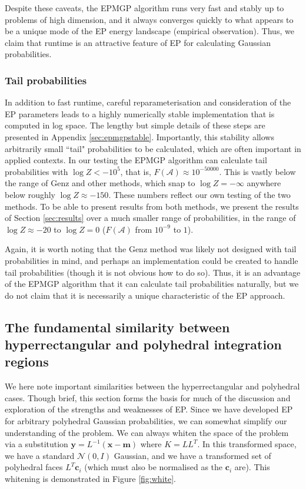\documentclass[twoside,11pt]{article}
\def\x{{\mathbf x}}
\def\y{{\mathbf y}}
\def\c{{\mathbf c}}
\def\m{{\mathbf m}}
\def\regionA{\mathcal{A}}
\begin{document}
Despite these caveats, the EPMGP algorithm runs very fast and stably up to problems of high dimension, and it always converges quickly to what appears to be a unique mode of the EP energy landscape (empirical observation).  Thus, we claim that runtime is an attractive feature of EP for calculating Gaussian probabilities.

\subsubsection{Tail probabilities}

In addition to fast runtime, careful reparameterisation and consideration of the EP parameters leads to a highly numerically stable implementation that is computed in log space.  The lengthy but simple details of these steps are presented in Appendix \ref{sec:epmgpstable}.  Importantly, this stability allows arbitrarily small ``tail" probabilities to be calculated, which are often important in applied contexts.  In our testing the EPMGP algorithm can calculate tail probabilities with $\log Z < -10^5$, that is, $F(\regionA) \approx 10^{-50000}$.  This is vastly below the range of Genz and other methods, which snap to $\log Z = -\infty$ anywhere below roughly $\log Z \approx -150$.  These numbers reflect our own testing of the two methods.  To be able to present results from both methods, we present the results of Section \ref{sec:results} over a much smaller range of probabilities, in the range of $\log Z \approx -20$ to $\log Z = 0$ ($F(\regionA)$ from $10^{-9}$ to $1$).

Again, it is worth noting that the Genz method was likely not designed with tail probabilities in mind, and perhaps an implementation could be created to handle tail probabilities (though it is not obvious how to do so).  Thus, it is an advantage of the EPMGP algorithm that it can calculate tail probabilities naturally, but we do not claim that it is necessarily a unique characteristic of the EP approach.


\subsection{The fundamental similarity between hyperrectangular and polyhedral integration regions}
\label{sec:white}
We here note important similarities between the hyperrectangular and polyhedral cases.  Though brief, this section forms the basis for much of the discussion and exploration of the strengths and weaknesses of EP.  Since we have developed EP for arbitrary polyhedral Gaussian probabilities, we can somewhat simplify our understanding of the problem.  We can always whiten the space of the problem via a substitution $\y = L^{-1}(\x - \m)$ where $K = LL^T$.   In this transformed space, we have a standard $\mathcal{N}(0,I)$ Gaussian, and we have a transformed set of polyhedral faces $L^T\c_i$ (which must also be normalised as the $\c_i$ are).   This whitening is demonstrated in Figure \ref{fig:white}.   
\end{document}
